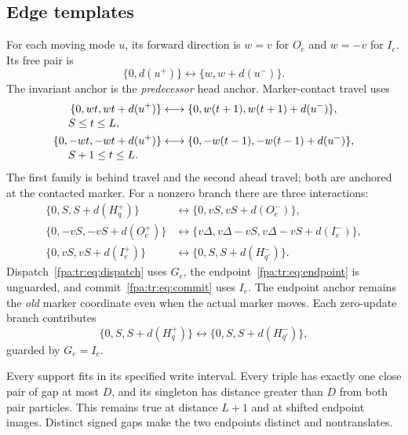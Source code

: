 \documentclass[11pt,a4paper]{article}
\numberwithin{equation}{section}
\begin{document}
\subsection{Edge templates}
For each moving mode $u$, its forward direction is $w=v$ for $O_e$ and $w=-v$ for $I_e$. Its free pair is
\begin{equation}\label{fpa:tr:eq:free}
\{0,d(u^+)\}\longleftrightarrow\{w,w+d(u^-)\}.
\end{equation}
The invariant anchor is the \emph{predecessor} head anchor. Marker-contact travel uses
\begin{align}
\{0,wt,wt+d(u^+)\}&\longleftrightarrow
\{0,w(t+1),w(t+1)+d(u^-)\},\label{fpa:tr:eq:behind}\\[-2pt]
&\hspace{-3cm} S\le t\le L,\notag\\
\{0,-wt,-wt+d(u^+)\}&\longleftrightarrow
\{0,-w(t-1),-w(t-1)+d(u^-)\},\label{fpa:tr:eq:ahead}\\[-2pt]
&\hspace{-3cm} S+1\le t\le L.\notag
\end{align}
The first family is behind travel and the second ahead travel; both are anchored at the contacted marker. For a nonzero branch there are three interactions:
\begin{align}
\{0,S,S+d(H_q^+)\}&\longleftrightarrow
\{0,vS,vS+d(O_e^-)\},\label{fpa:tr:eq:dispatch}\\
\{0,-vS,-vS+d(O_e^+)\}&\longleftrightarrow
\{v\Delta,v\Delta-vS,v\Delta-vS+d(I_e^-)\},\label{fpa:tr:eq:endpoint}\\
\{0,vS,vS+d(I_e^+)\}&\longleftrightarrow
\{0,S,S+d(H_{q'}^-)\}.\label{fpa:tr:eq:commit}
\end{align}
Dispatch~\eqref{fpa:tr:eq:dispatch} uses $G_e$, the endpoint~\eqref{fpa:tr:eq:endpoint} is unguarded, and commit~\eqref{fpa:tr:eq:commit} uses $I_e$. The endpoint anchor remains the \emph{old} marker coordinate even when the actual marker moves. Each zero-update branch contributes
\begin{equation}\label{fpa:tr:eq:direct}
\{0,S,S+d(H_q^+)\}\longleftrightarrow
\{0,S,S+d(H_{q'}^-)\},
\end{equation}
guarded by $G_e=I_e$.

Every support fits in its specified write interval. Every triple has exactly one close pair of gap at most $D$, and its singleton has distance greater than $D$ from both pair particles. This remains true at distance $L+1$ and at shifted endpoint images. Distinct signed gaps make the two endpoints distinct and nontranslates.
\end{document}
